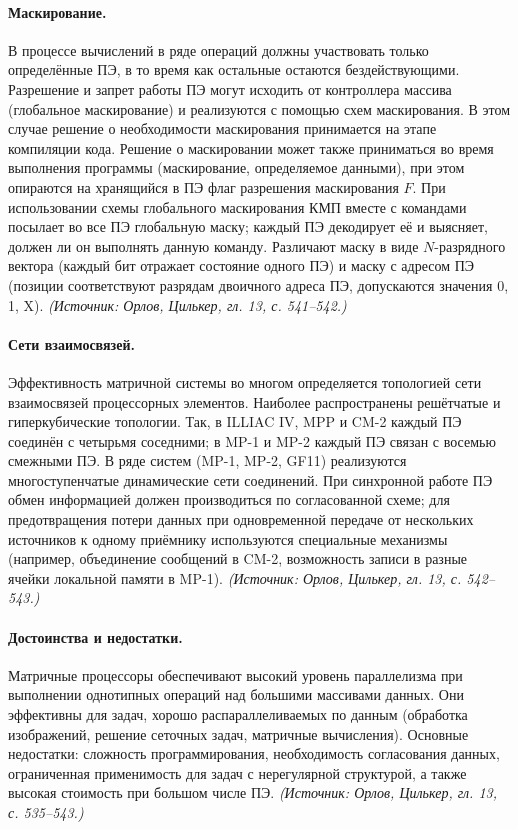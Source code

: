 \documentclass[a4paper,12pt]{article}
\begin{document}
\paragraph{Маскирование.}
В процессе вычислений в ряде операций должны участвовать только определённые ПЭ, в то время как остальные остаются бездействующими. Разрешение и запрет работы ПЭ могут исходить от контроллера массива (глобальное маскирование) и реализуются с помощью схем маскирования. В этом случае решение о необходимости маскирования принимается на этапе компиляции кода. Решение о маскировании может также приниматься во время выполнения программы (маскирование, определяемое данными), при этом опираются на хранящийся в ПЭ флаг разрешения маскирования \(F\). При использовании схемы глобального маскирования КМП вместе с командами посылает во все ПЭ глобальную маску; каждый ПЭ декодирует её и выясняет, должен ли он выполнять данную команду. Различают маску в виде \(N\)-разрядного вектора (каждый бит отражает состояние одного ПЭ) и маску с адресом ПЭ (позиции соответствуют разрядам двоичного адреса ПЭ, допускаются значения 0, 1, X).
\textit{(Источник: Орлов, Цилькер, гл. 13, с. 541--542.)}

\paragraph{Сети взаимосвязей.}
Эффективность матричной системы во многом определяется топологией сети взаимосвязей процессорных элементов. Наиболее распространены решётчатые и гиперкубические топологии. Так, в ILLIAC IV, MPP и CM-2 каждый ПЭ соединён с четырьмя соседними; в MP-1 и MP-2 каждый ПЭ связан с восемью смежными ПЭ. В ряде систем (MP-1, MP-2, GF11) реализуются многоступенчатые динамические сети соединений. При синхронной работе ПЭ обмен информацией должен производиться по согласованной схеме; для предотвращения потери данных при одновременной передаче от нескольких источников к одному приёмнику используются специальные механизмы (например, объединение сообщений в CM-2, возможность записи в разные ячейки локальной памяти в MP-1).
\textit{(Источник: Орлов, Цилькер, гл. 13, с. 542--543.)}

\paragraph{Достоинства и недостатки.}
Матричные процессоры обеспечивают высокий уровень параллелизма при выполнении однотипных операций над большими массивами данных. Они эффективны для задач, хорошо распараллеливаемых по данным (обработка изображений, решение сеточных задач, матричные вычисления). Основные недостатки: сложность программирования, необходимость согласования данных, ограниченная применимость для задач с нерегулярной структурой, а также высокая стоимость при большом числе ПЭ.
\textit{(Источник: Орлов, Цилькер, гл. 13, с. 535--543.)}
\end{document}
